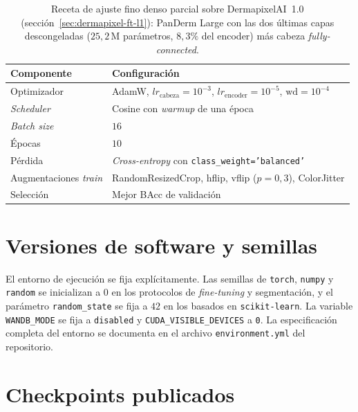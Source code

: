 \begin{table}[H]
\centering
\footnotesize
\setlength{\tabcolsep}{4pt}
\renewcommand{\arraystretch}{0.95}
\caption{Receta de ajuste fino denso parcial sobre DermapixelAI~1.0
(sección~\ref{sec:dermapixel-ft-l1}): PanDerm Large con las dos
últimas capas descongeladas ($25{,}2$\,M parámetros, $8{,}3\%$ del
encoder) más cabeza \emph{fully-connected}.}
\label{tab:anexoa-ft-recipe}
\begin{tabular}{ll}
\hline
Componente                  & Configuración \\
\hline
Optimizador                 & AdamW, $lr_{\mathrm{cabeza}} = 10^{-3}$, $lr_{\mathrm{encoder}} = 10^{-5}$, $\mathrm{wd} = 10^{-4}$ \\
\emph{Scheduler}            & Cosine con \emph{warmup} de una época \\
\emph{Batch size}           & $16$ \\
Épocas                      & $10$ \\
Pérdida                     & \emph{Cross-entropy} con \texttt{class\_weight='balanced'} \\
Augmentaciones \emph{train} & RandomResizedCrop, hflip, vflip ($p=0{,}3$), ColorJitter \\
Selección                   & Mejor BAcc de validación \\
\hline
\end{tabular}
\end{table}

\section{Versiones de software y semillas}
\label{sec:anexoa-versiones}

El entorno de ejecución se fija explícitamente. Las semillas de
\texttt{torch}, \texttt{numpy} y \texttt{random} se inicializan a
$0$ en los protocolos de \emph{fine-tuning} y segmentación, y
el parámetro \texttt{random\_state} se fija a $42$ en los
basados en \texttt{scikit-learn}. La variable
\texttt{WANDB\_MODE} se fija a \texttt{disabled} y
\texttt{CUDA\_VISIBLE\_DEVICES} a \texttt{0}. La especificación
completa del entorno se documenta en el archivo \texttt{environment.yml}
del repositorio.

\section{Checkpoints publicados}
\label{sec:anexoa-checkpoints}

